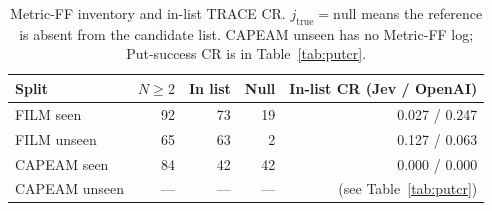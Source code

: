 \begin{table}[t]
\centering
\caption{Metric-FF inventory and in-list TRACE CR.
$j_{\mathrm{true}}{=}\mathrm{null}$ means the reference is absent from the candidate list.
CAPEAM unseen has no Metric-FF log; Put-success CR is in Table~\ref{tab:putcr}.}
\label{tab:jtrue}
\scriptsize
\setlength{\tabcolsep}{3pt}
\begin{tabular}{lrrrr}
\toprule
Split & $N\ge 2$ & In list & Null & In-list CR (Jev / OpenAI) \\
\midrule
FILM seen & 92 & 73 & 19 & 0.027 / 0.247 \\
FILM unseen & 65 & 63 & 2 & 0.127 / 0.063 \\
CAPEAM seen & 84 & 42 & 42 & 0.000 / 0.000 \\
CAPEAM unseen & --- & --- & --- & (see Table~\ref{tab:putcr}) \\
\bottomrule
\end{tabular}
\end{table}
